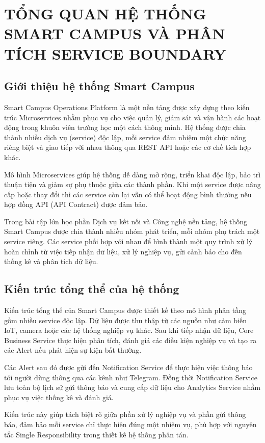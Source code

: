 \chapter{TỔNG QUAN HỆ THỐNG SMART CAMPUS VÀ PHÂN TÍCH SERVICE BOUNDARY}

\section{Giới thiệu hệ thống Smart Campus}

Smart Campus Operations Platform là một nền tảng được xây dựng theo kiến trúc Microservices nhằm phục vụ cho việc quản lý, giám sát và vận hành các hoạt động trong khuôn viên trường học một cách thông minh. Hệ thống được chia thành nhiều dịch vụ (service) độc lập, mỗi service đảm nhiệm một chức năng riêng biệt và giao tiếp với nhau thông qua REST API hoặc các cơ chế tích hợp khác.

Mô hình Microservices giúp hệ thống dễ dàng mở rộng, triển khai độc lập, bảo trì thuận tiện và giảm sự phụ thuộc giữa các thành phần. Khi một service được nâng cấp hoặc thay đổi thì các service còn lại vẫn có thể hoạt động bình thường nếu hợp đồng API (API Contract) được đảm bảo.

Trong bài tập lớn học phần Dịch vụ kết nối và Công nghệ nền tảng, hệ thống Smart Campus được chia thành nhiều nhóm phát triển, mỗi nhóm phụ trách một service riêng. Các service phối hợp với nhau để hình thành một quy trình xử lý hoàn chỉnh từ việc tiếp nhận dữ liệu, xử lý nghiệp vụ, gửi cảnh báo cho đến thống kê và phân tích dữ liệu.

\section{Kiến trúc tổng thể của hệ thống}

Kiến trúc tổng thể của Smart Campus được thiết kế theo mô hình phân tầng gồm nhiều service độc lập. Dữ liệu được thu thập từ các nguồn như cảm biến IoT, camera hoặc các hệ thống nghiệp vụ khác. Sau khi tiếp nhận dữ liệu, Core Business Service thực hiện phân tích, đánh giá các điều kiện nghiệp vụ và tạo ra các Alert nếu phát hiện sự kiện bất thường.

Các Alert sau đó được gửi đến Notification Service để thực hiện việc thông báo tới người dùng thông qua các kênh như Telegram. Đồng thời Notification Service lưu toàn bộ lịch sử gửi thông báo và cung cấp dữ liệu cho Analytics Service nhằm phục vụ việc thống kê và đánh giá.

Kiến trúc này giúp tách biệt rõ giữa phần xử lý nghiệp vụ và phần gửi thông báo, đảm bảo mỗi service chỉ thực hiện đúng một nhiệm vụ, phù hợp với nguyên tắc Single Responsibility trong thiết kế hệ thống phân tán.

